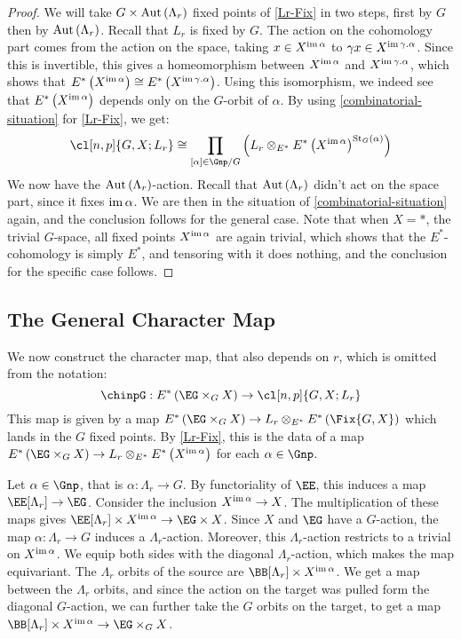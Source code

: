 \begin{proof}
	We will take $G \times \operatorname{Aut} \left(\Lambda_r\right)$ fixed points of \ref{Lr-Fix} in two steps, first by $G$ then by $\operatorname{Aut} \left(\Lambda_r\right)$.
	Recall that $L_r$ is fixed by $G$.
	The action on the cohomology part comes from the action on the space, taking $x \in X^{\operatorname{im} \alpha}$ to $\gamma x \in X^{\operatorname{im} \gamma.\alpha}$.
	Since this is invertible, this gives a homeomorphism between $X^{\operatorname{im} \alpha}$ and $X^{\operatorname{im} \gamma.\alpha}$, which shows that $E^*\left(X^{\operatorname{im} \alpha}\right) \cong E^*\left(X^{\operatorname{im} \gamma.\alpha}\right)$.
	Using this isomorphism, we indeed see that $E^*\left(X^{\operatorname{im} \alpha}\right)$ depends only on the $G$-orbit of $\alpha$.
	By using \ref{combinatorial-situation} for \ref{Lr-Fix}, we get:
	$$
	\cl[n,p]{G,X; L_r}
	\cong \prod_{\left[\alpha\right] \in \Gnp/G} \left(L_r \otimes_{E^*} E^*\left(X^{\im \alpha}\right)^{\stab_G\left(\alpha\right)}\right)
	$$
	We now have the $\operatorname{Aut} \left(\Lambda_r\right)$-action.
	Recall that $\operatorname{Aut} \left(\Lambda_r\right)$ didn't act on the space part, since it fixes $\operatorname{im} \alpha$.
	We are then in the situation of \ref{combinatorial-situation} again, and the conclusion follows for the general case.
	Note that when $X = *$, the trivial $G$-space, all fixed points $X^{\operatorname{im} \alpha}$ are again trivial, which shows that the $E^*$-cohomology is simply $E^*$, and tensoring with it does nothing, and the conclusion for the specific case follows.
\end{proof}



\subsection{The General Character Map}

We now construct the character map, that also depends on $r$, which is omitted from the notation:
$$\chinpG: E^*\left(\EG \times_G X\right) \to \cl[n,p]{G,X; L_r}$$
This map is given by a map $E^*\left(\EG \times_G X\right) \to L_r \otimes_{E^*} E^*\left(\Fix{G,X}\right)$ which lands in the $G$ fixed points.
By \ref{Lr-Fix}, this is the data of a map $E^*\left(\EG \times_G X\right) \to L_r \otimes_{E^*} E^*\left(X^{\im \alpha}\right)$ for each $\alpha \in \Gnp$.

Let $\alpha \in \Gnp$, that is $\alpha: \Lambda_r \to G$.
By functoriality of $\EE$, this induces a map $\EE[\Lambda_r] \to \EG$.
Consider the inclusion $X^{\operatorname{im} \alpha} \to X$.
The multiplication of these maps gives $\EE[\Lambda_r] \times X^{\im \alpha} \to \EG \times X$.
Since $X$ and $\EG$ have a $G$-action, the map $\alpha: \Lambda_r \to G$ induces a $\Lambda_r$-action.
Moreover, this $\Lambda_r$-action restricts to a trivial on $X^{\operatorname{im} \alpha}$.
We equip both sides with the diagonal $\Lambda_r$-action, which makes the map equivariant.
The $\Lambda_r$ orbits of the source are $\BB[\Lambda_r] \times X^{\im \alpha}$.
We get a map between the $\Lambda_r$ orbits, and since the action on the target was pulled form the diagonal $G$-action, we can further take the $G$ orbits on the target, to get a map $\BB[\Lambda_r] \times X^{\im \alpha} \to \EG \times_G X$.

